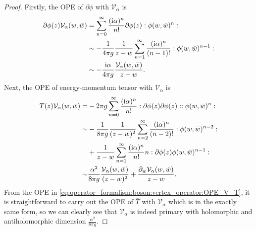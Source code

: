 \documentclass[10pt]{article}
\newcommand{\ii}{\mathrm{i}}
\begin{document}
\begin{proof}
    Firstly, the OPE of $\partial\phi$ with $\mathcal{V}_\alpha$ is
    \begin{align}
        \partial\phi(z)\mathcal{V}_\alpha(w,\bar{w}) & =\sum_{n=0}^\infty\frac{(\ii\alpha)^n}{n!}\partial\phi(z):\phi(w,\bar{w})^n:\notag                             \\
                                                     & \sim-\frac{1}{4\pi g}\frac{1}{z-w}\sum_{n=1}^{\infty}\frac{(\ii\alpha)^n}{(n-1)!}:\phi(w,\bar{w})^{n-1}:\notag \\
                                                     & \sim-\frac{\ii\alpha}{4\pi g}\frac{\mathcal{V}_\alpha(w,\bar{w})}{z-w}.
    \end{align}
    Next, the OPE of energy-momentum tensor with $\mathcal{V}_\alpha$ is 
    \begin{align}
        T(z)\mathcal{V}_\alpha(w,\bar{w})= & -2\pi g\sum_{n=0}^{\infty}\frac{(\ii\alpha)^n}{n!}:\partial\phi(z)\partial\phi(z)::\phi(w,\bar{w})^n:\notag                                                                          \\
        \sim                               & -\frac{1}{8\pi g}\frac{1}{(z-w)^2}\sum_{n=2}^{\infty}\frac{(\ii\alpha)^n}{(n-2)!}:\phi(w,\bar{w})^{n-2}:\notag                                                                       \\
                                           & +\frac{1}{z-w}\sum_{n=1}^{\infty}\frac{(\ii\alpha)^n}{n!}n:\partial\phi(z)\phi(w,\bar{w})^{n-1}:\notag                                                                               \\
        \sim                               & \frac{\alpha^2}{8\pi g}\frac{\mathcal{V}_\alpha(w,\bar{w})}{(z-w)^2}+\frac{\partial_w\mathcal{V}_\alpha(w,\bar{w})}{z-w}.\label{eq:operator_formalism:boson:vertex_operator:OPE_V_T}
    \end{align}
    From the OPE in \cref{eq:operator_formalism:boson:vertex_operator:OPE_V_T}, it is straightforward to carry out the OPE of $\bar{T}$ with $\mathcal{V}_\alpha$ which is in the exactly same form, so we can clearly see that $\mathcal{V}_\alpha$ is indeed primary with holomorphic and antiholomorphic dimension $\frac{\alpha^2}{8\pi g}$. 
\end{proof}
\end{document}
